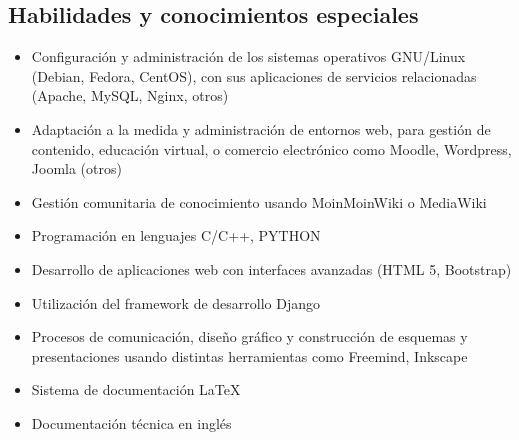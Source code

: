 \documentclass[overlapped,line,final,letterpaper]{res}
\begin{document}
\begin{resume}
\section{\sc Habilidades y conocimientos especiales}
\vspace{0.5cm}
\begin{itemize}
	\item Configuración y administración de los sistemas operativos GNU/Linux (Debian, Fedora, CentOS), con sus aplicaciones de servicios relacionadas (Apache, MySQL, Nginx, otros)
	\item Adaptación a la medida y administración de entornos web, para gestión de contenido, educación virtual, o comercio electrónico como Moodle, Wordpress, Joomla (otros)
	\item Gestión comunitaria de conocimiento usando MoinMoinWiki o MediaWiki
	\item Programación en lenguajes C/C++, PYTHON
	\item Desarrollo de aplicaciones web con interfaces avanzadas (HTML 5, Bootstrap)
	\item Utilización del framework de desarrollo Django
 	\item Procesos de comunicación, diseño gráfico y construcción de esquemas y presentaciones usando distintas herramientas como Freemind, Inkscape
	\item Sistema de documentación \LaTeX  	
	\item Documentación técnica en inglés

\end{itemize}


\end{resume}
\end{document}
